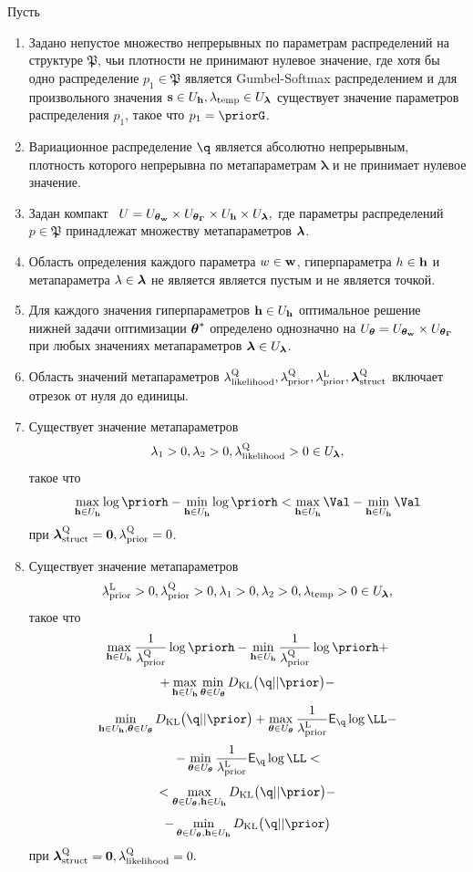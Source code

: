 \begin{theorem}
Пусть
\begin{enumerate}%
\item Задано непустое множество непрерывных по параметрам распределений на структуре $\mathfrak{P}$, чьи плотности не принимают нулевое значение, где хотя бы одно распределение $p_1 \in \mathfrak{P}$ является Gumbel-Softmax распределением и для произвольного значения $\mathbf{s} \in U_{\mathbf{h}}, \lambda_{\text{temp}} \in U_{\boldsymbol{\lambda}}$ существует значение параметров распределения $p_1$, такое что $p_1 = \priorG$.

\item Вариационное распределение $\q$ является  абсолютно непрерывным, плотность которого непрерывна по метапараметрам $\boldsymbol{\lambda}$ и не принимает нулевое значение.

\item Задан компакт  $U = U_{\boldsymbol{\theta}_\mathbf{w}} \times U_{\boldsymbol{\theta}_{\boldsymbol{\Gamma}}} \times U_{\mathbf{h}} \times U_{\boldsymbol{\lambda}},$ где параметры распределений $p \in \mathfrak{P}$ принадлежат множеству метапараметров $\boldsymbol{\lambda}$.

\item Область определения каждого параметра $w \in\mathbf{w}$, гиперпараметра $h \in \mathbf{h}$ и метапараметра $\lambda \in \boldsymbol{\lambda}$ не является является пустым и не является точкой.

\item Для каждого значения гиперпараметров $\mathbf{h} \in U_{\mathbf{h}}$ оптимальное решение нижней задачи оптимизации $\boldsymbol{\theta}^{*}$ определено однозначно на $U_{\boldsymbol{\theta}} = U_{\boldsymbol{\theta}_\mathbf{w}} \times U_{\boldsymbol{\theta}_{\boldsymbol{\Gamma}}}$ при любых значениях метапараметров $\boldsymbol{\lambda} \in U_{\boldsymbol{\lambda}}$.

\item Область значений метапараметров $\lambda_\text{likelihood}^\text{Q}, \lambda_\text{prior}^\text{Q}, \lambda_\text{prior}^\text{L}, \boldsymbol{\lambda}_\text{struct}^\text{Q}$ включает отрезок от нуля до единицы.

\item Существует значение метапараметров $$\lambda_1>0, \lambda_2>0, \lambda_\text{likelihood}^\text{Q}>0  \in U_{\boldsymbol{\lambda}},$$ такое что
\[
\max_{\h \in \Uh} \log \priorh -\min_{\h \in \Uh}\log \priorh < \max_{\h \in \Uh} \Val - \min_{\h \in \Uh} \Val
\] 
при $\boldsymbol{\lambda}_\text{struct}^\text{Q} = \mathbf{0}, \lambda_\text{prior}^\text{Q} = 0$.

\item Существует значение метапараметров $$\lambda_\text{prior}^\text{L}>0, \lambda_\text{prior}^\text{Q}>0, \lambda_1>0, \lambda_2>0, \lambda_{\text{temp}}>0 \in U_{\boldsymbol{\lambda}},$$ такое что 
\[
    \max_{\h \in \Uh} \frac{1}{\lamCQ}\log  \priorh - \min_{\h \in \Uh} \frac{1}{\lamCQ}\log  \priorh +
\]
\[
 + \max_{\h \in \Uh} \min_{\teta \in \Uteta} \KL{\q}{\prior} -
\]
\[ \min_{\h \in \Uh, \teta \in \Uteta}  \KL{\q}{\prior} + \max_{\teta \in \Uteta}\frac{1}{\lamCL}\E_{\q} \log \LL - 
\]
\[
 - \min_{\teta \in \Uteta}\frac{1}{\lamCL}\E_{\q} \log \LL  <
\]
\[ 
< \max_{\teta \in \Uteta, \h \in \Uh} \KL{\q}{\prior} -
\]
\[
-\min_{\teta \in \Uteta, \h \in \Uh} \KL{\q}{\prior}
\]
при $\boldsymbol{\lambda}_\text{struct}^\text{Q} = \mathbf{0}, \lambda_\text{likelihood}^\text{Q} = 0.$


\end{enumerate}
\end{theorem}
